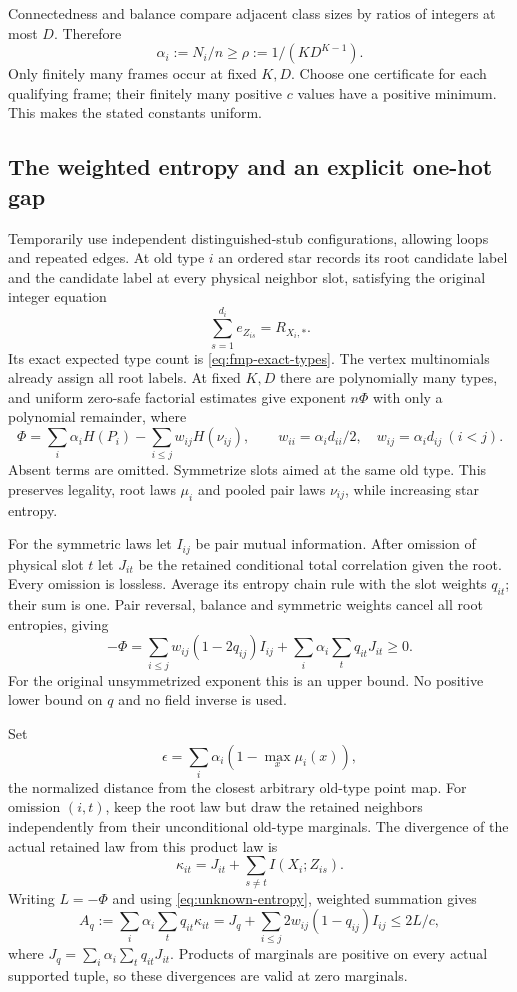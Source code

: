 Connectedness and balance compare adjacent class sizes by ratios of
integers at most $D$. Therefore
\begin{equation}\label{eq:unknown-rho}
 \alpha_i:=N_i/n\ge\rho:=1/(KD^{K-1}).
\end{equation}
Only finitely many frames occur at fixed $K,D$. Choose one certificate
for each qualifying frame; their finitely many positive $c$ values
have a positive minimum. This makes the stated constants uniform.

\subsection{The weighted entropy and an explicit one-hot gap}
Temporarily use independent distinguished-stub configurations, allowing
loops and repeated edges. At old type $i$ an ordered star records
its root candidate label and the candidate label at every physical
neighbor slot, satisfying the original integer equation
\[
 \sum_{s=1}^{d_i}e_{Z_{is}}=R_{X_i,*}.
\]
Its exact expected type count is \eqref{eq:fmp-exact-types}.
The vertex multinomials already assign all root labels.
At fixed $K,D$ there are polynomially many types, and uniform
zero-safe factorial estimates give exponent $n\Phi$ with only a
polynomial remainder, where
\[
 \Phi=\sum_i\alpha_iH(P_i)-\sum_{i\le j}w_{ij}H(\nu_{ij}),\qquad
 w_{ii}=\alpha_id_{ii}/2,\quad w_{ij}=\alpha_id_{ij}\ (i<j).
\]
Absent terms are omitted. Symmetrize slots aimed at the same old
type. This preserves legality, root laws $\mu_i$ and pooled pair
laws $\nu_{ij}$, while increasing star entropy.

For the symmetric laws let $I_{ij}$ be pair mutual information.
After omission of physical slot $t$ let $J_{it}$ be the retained
conditional total correlation given the root. Every omission is
lossless. Average its entropy chain rule with the slot weights
$q_{it}$; their sum is one. Pair reversal, balance and symmetric
weights cancel all root entropies, giving
\begin{equation}\label{eq:unknown-entropy}
 -\Phi=\sum_{i\le j}w_{ij}(1-2q_{ij})I_{ij}
             +\sum_i\alpha_i\sum_tq_{it}J_{it}\ge0.
\end{equation}
For the original unsymmetrized exponent this is an upper bound.
No positive lower bound on $q$ and no field inverse is used.

Set
\[
 \epsilon=\sum_i\alpha_i(1-\max_x\mu_i(x)),
\]
the normalized distance from the closest arbitrary old-type point map.
For omission $(i,t)$, keep the root law but draw the retained neighbors
independently from their unconditional old-type marginals. The
divergence of the actual retained law from this product law is
\[
 \kappa_{it}=J_{it}+\sum_{s\ne t}I(X_i;Z_{is}).
\]
Writing $L=-\Phi$ and using \eqref{eq:unknown-entropy}, weighted
summation gives
\begin{equation}\label{eq:unknown-KL}
 A_q:=\sum_i\alpha_i\sum_tq_{it}\kappa_{it}
 =J_q+\sum_{i\le j}2w_{ij}(1-q_{ij})I_{ij}\le2L/c,
\end{equation}
where $J_q=\sum_i\alpha_i\sum_tq_{it}J_{it}$.
Products of marginals are positive on every actual supported tuple,
so these divergences are valid at zero marginals.

